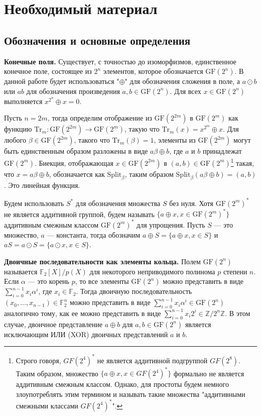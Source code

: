 \section{Необходимый материал}
\subsection{Обозначения и основные определения}
\textbf{Конечные поля.} Существует, с точностью до изоморфизмов, единственное конечное поле, состоящее из \(2^n\) элементов, которое обозначается \(\text{GF}(2^n)\). В данной работе будет использоваться "\(\oplus\)" для обозначения сложения в поле, а \(a \odot b\) или \(ab\) для обозначения произведения \(a, b \in \text{GF}(2^n)\). Для всех \(x \in \text{GF}(2^n)\) выполняется \(x^{2^n} \oplus x = 0\).

Пусть \(n = 2m\), тогда определим отображение из \(\text{GF}(2^{2m})\) в \(\text{GF}(2^m)\) как функцию \(\text{Tr}_m: \text{GF}(2^{2m}) \rightarrow \text{GF}(2^m)\), такую что \(\text{Tr}_m(x) = x^{2^m} \oplus x\). Для любого \(\beta \in \text{GF}(2^{2m})\), такого что \(\text{Tr}_m(\beta) = 1\), элементы из \(\text{GF}(2^{2m})\) могут быть единственным образом разложены в виде \(a\beta \oplus b\), где \(a\) и \(b\) принадлежат \(\text{GF}(2^m)\). Биекция, отображающая \(x \in \text{GF}(2^{2m})\) в \((a, b) \in \text{GF}(2^m)\)\footnote{Строго говоря, \(GF(2^4)^*\) не является аддитивной подгруппой \(GF(2^8)\). Таким образом, множество \(\{a \oplus x, x \in GF(2^4)^*\}\) формально не является аддитивным смежным классом. Однако, для простоты будем немного злоупотреблять этим термином и называть такие множества "аддитивными смежными классами \(GF(2^4)^*\)".} такая, что \(x = a\beta \oplus b\), обозначается как \(\text{Split}_\beta\), таким образом \(\text{Split}_\beta(a\beta \oplus b) = (a, b)\). Это линейная функция.

Будем использовать \(S^*\) для обозначения множества \(S\) без нуля. Хотя \(\text{GF}(2^m)^*\) не является аддитивной группой, будем называть \(\{a \oplus x, x \in \text{GF}(2^m)^*\}\) аддитивным смежным классом \(\text{GF}(2^m)^*\) для упрощения. Пусть \(S\) — это множество, \(a\) — константа, тогда обозначим \(a \oplus S = \{a \oplus x, x \in S\}\) и \(aS = a \odot S = \{a \odot x, x \in S\}\).

\textbf{Двоичные последовательности как элементы кольца.} Полем \(\text{GF}(2^n)\) называется \(\mathbb{F}_2[X]/p(X)\) для некоторого неприводимого полинома \(p\) степени \(n\). Если \(\alpha\) — это корень \(p\), то все элементы \(\text{GF}(2^n)\) можно представить в виде \(\sum_{i=0}^{n-1} x_i \alpha^i\), где \(x_i \in \mathbb{F}_2\). Тогда двоичную последовательность \((x_0, \ldots, x_{n-1}) \in \mathbb{F}_2^n\) можно представить в виде \(\sum_{i=0}^{n-1} x_i \alpha^i \in \text{GF}(2^n)\) аналогично тому, как ее можно представить в виде \(\sum_{i=0}^{n-1} x_i 2^i \in \mathbb{Z}/2^n\mathbb{Z}\). В этом случае, двоичное представление \(a \oplus b\) для \(a, b \in \text{GF}(2^n)\) является исключающим ИЛИ (XOR) двоичных представлений \(a\) и \(b\).

